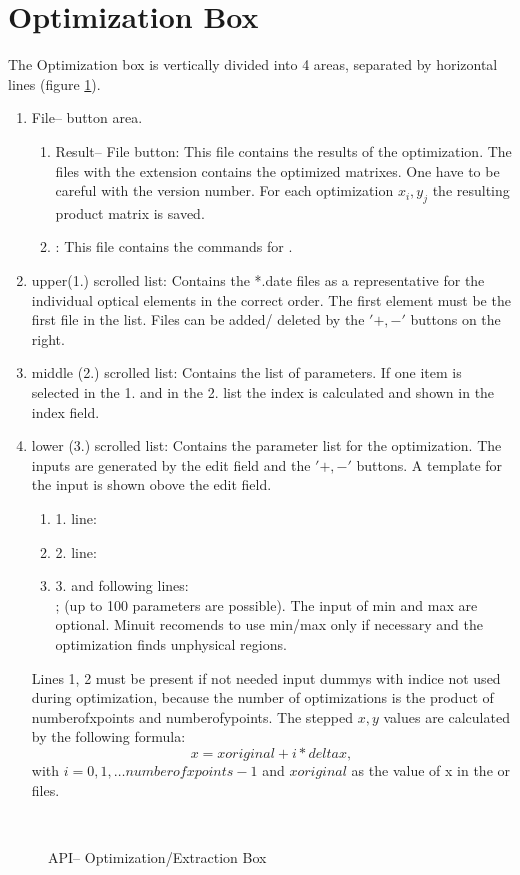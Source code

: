 \section{Optimization Box}

The Optimization box is vertically divided into 4 areas, separated by
horizontal lines (figure \ref {obox}).
\begin {enumerate} 
\item File-- button area.
	\begin {enumerate} 
	\item Result-- File button: This file contains the results of the
optimization. The files with the extension  contains
the optimized matrixes. One have to be careful with the version number. For
each optimization $x_i, y_j$ the resulting product matrix is saved.
\item {}: This file contains the commands for 
\minuit.
\end {enumerate}      
\item  upper(1.) scrolled list: Contains the *.date files as a representative 
for the individual optical elements in the correct order. The first element 
must be the first file in the list. Files can be added/ deleted by the $'+,-'$ 
buttons  on  the right.
\item middle (2.) scrolled list: Contains the list of parameters. If one item
is selected in the 1. and in the 2. list the index is calculated and shown in 
the index field. 
\item lower (3.) scrolled list: Contains the parameter list for the
optimization. The inputs are generated by the edit field and the $'+,-'$
buttons. A template for the input is shown obove the edit field.
\begin {enumerate}   
\item 1. line:     
\item 2. line:     
\item 3. and following lines:\hfill \\
         ; (up to 100 
parameters are possible). The input of min and max are optional. {\sc
Minuit} recomends to use min/max only if necessary and the optimization finds
unphysical regions.   
\end {enumerate}      
Lines 1, 2 must be present if not needed input dummys with indice not used
during optimization, because the number of optimizations is the product of 
numberofxpoints and numberofypoints. The stepped $x,y$ values are
calculated by the following formula:
\[ x= xoriginal + i * deltax,\]
with $i= 0,1,\ldots numberofxpoints-1$ and  $xoriginal$ as the value of x in
the  or  files.
\end {enumerate}  
\begin{figure}
\centerline{ \hbox{
 }}  
  \caption {\label{obox} \phase API-- Optimization/Extraction Box} 
\end {figure}   
 
